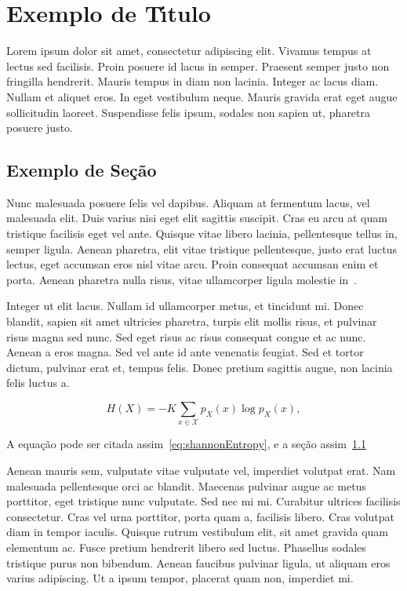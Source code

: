 \chapter{Exemplo de T\'{\i}tulo}
\label{cap:cap02}

Lorem ipsum dolor sit amet, consectetur adipiscing elit. Vivamus tempus at lectus sed facilisis. Proin posuere id lacus in semper. Praesent semper justo non fringilla hendrerit. Mauris tempus in diam non lacinia. Integer ac lacus diam. Nullam et aliquet eros. In eget vestibulum neque. Mauris gravida erat eget augue sollicitudin laoreet. Suspendisse felis ipsum, sodales non sapien ut, pharetra posuere justo.

\section{Exemplo de Se\c{c}\~{a}o}
\label{sec:sec02}

Nunc malesuada posuere felis vel dapibus. Aliquam at fermentum lacus, vel malesuada elit. Duis varius nisi eget elit sagittis suscipit. Cras eu arcu at quam tristique facilisis eget vel ante. Quisque vitae libero lacinia, pellentesque tellus in, semper ligula. Aenean pharetra, elit vitae tristique pellentesque, justo erat luctus lectus, eget accumsan eros nisl vitae arcu. Proin consequat accumsan enim et porta. Aenean pharetra nulla risus, vitae ullamcorper ligula molestie in~\cite{Cover2006}.

Integer ut elit lacus. Nullam id ullamcorper metus, et tincidunt mi. Donec blandit, sapien sit amet ultricies pharetra, turpis elit mollis risus, et pulvinar risus magna sed nunc. Sed eget risus ac risus consequat congue et ac nunc. Aenean a eros magna. Sed vel ante id ante venenatis feugiat. Sed et tortor dictum, pulvinar erat et, tempus felis. Donec pretium sagittis augue, non lacinia felis luctus a.

\begin{equation}
H(X) =-K\sum_{x\in\mathcal{X}} p_X(x)\log p_X(x),
\label{eq:shannonEntropy}
\end{equation}

A equa\c{c}\~{a}o pode ser citada assim~\eqref{eq:shannonEntropy}, e a se\c{c}\~{a}o assim~\ref{sec:sec02}

Aenean mauris sem, vulputate vitae vulputate vel, imperdiet volutpat erat. Nam malesuada pellentesque orci ac blandit. Maecenas pulvinar augue ac metus porttitor, eget tristique nunc vulputate. Sed nec mi mi. Curabitur ultrices facilisis consectetur. Cras vel urna porttitor, porta quam a, facilisis libero. Cras volutpat diam in tempor iaculis. Quisque rutrum vestibulum elit, sit amet gravida quam elementum ac. Fusce pretium hendrerit libero sed luctus. Phasellus sodales tristique purus non bibendum. Aenean faucibus pulvinar ligula, ut aliquam eros varius adipiscing. Ut a ipsum tempor, placerat quam non, imperdiet mi.

